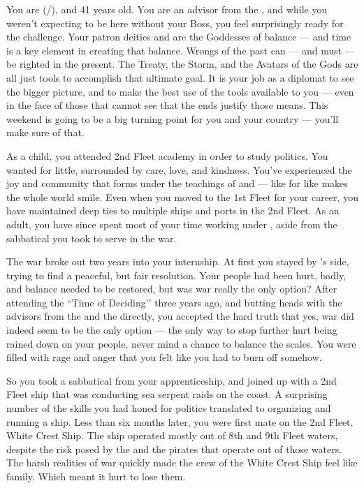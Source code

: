 \documentclass[char]{GL2020}
\begin{document}
\name{\cJuniorStatesman{}}

You are \cJuniorStatesman{\full} (\cJuniorStatesman{\they}/\cJuniorStatesman{\them}), and 41 years old. You are an advisor from the \pShip{}, and while you weren't expecting to be here without your Boss, you feel surprisingly ready for the challenge. Your patron deities \cEbbFull{\full} and \cFlowFull{\full} are the Goddesses of balance — and time is a key element in creating that balance. Wrongs of the past can — and must — be righted in the present. The Treaty, the Storm, and the Avatars of the Gods are all just tools to accomplish that ultimate goal. It is your job as a diplomat to see the bigger picture, and to make the best use of the tools available to you — even in the face of those that cannot see that the ends justify those means. This weekend is going to be a big turning point for you and your country — you'll make sure of that.

As a child, you attended 2nd Fleet academy in order to study politics. You wanted for little, surrounded by care, love, and kindness. You’ve experienced the joy and community that forms under the teachings of \cEbb{} and \cFlow{} — like for like makes the whole world smile. Even when you moved to the 1st Fleet for your career, you have maintained deep ties to multiple ships and ports in the 2nd Fleet. As an adult, you have since spent most of your time working under \cHeadDiplomat{\full}, aside from the sabbatical you took to serve in the war. 

The war broke out two years into your internship. At first you stayed by \cHeadDiplomat{}’s side, trying to find a peaceful, but fair resolution. Your people had been hurt, badly, and balance needed to be restored, but was war really the only option? After attending the ``Time of Deciding’’ three years ago, and butting heads with the advisors from the \pFarm{} and the \pTech{} directly, you accepted the hard truth that yes, war did indeed seem to be the only option — the only way to stop further hurt being rained down on your people, never mind a chance to balance the scales. You were filled with rage and anger that you felt like you had to burn off somehow.

So you took a sabbatical from your apprenticeship, and joined up with a 2nd Fleet ship that was conducting sea serpent raids on the \pFarm{} coast. A surprising number of the skills you had honed for politics translated to organizing and running a ship. Less than six months later, you were first mate on the 2nd Fleet, White Crest Ship. The ship operated mostly out of 8th and 9th Fleet waters, despite the risk posed by the \pWod{} and the pirates that operate out of those waters. The harsh realities of war quickly made the crew of the White Crest Ship feel like family. Which meant it hurt to lose them. 
\end{document}
